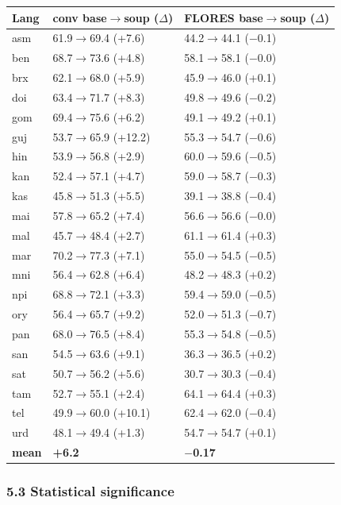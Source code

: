 \documentclass[
  11pt,
]{article}
\begin{document}
\begin{longtable}[]{@{}lll@{}}
\toprule\noalign{}
Lang & conv base$\to$soup ($\Delta$) & FLORES base$\to$soup ($\Delta$) \\
\midrule\noalign{}
\endhead
\bottomrule\noalign{}
\endlastfoot
asm & 61.9$\to$69.4 (+7.6) & 44.2$\to$44.1 ($-$0.1) \\
ben & 68.7$\to$73.6 (+4.8) & 58.1$\to$58.1 ($-$0.0) \\
brx & 62.1$\to$68.0 (+5.9) & 45.9$\to$46.0 (+0.1) \\
doi & 63.4$\to$71.7 (+8.3) & 49.8$\to$49.6 ($-$0.2) \\
gom & 69.4$\to$75.6 (+6.2) & 49.1$\to$49.2 (+0.1) \\
guj & 53.7$\to$65.9 (+12.2) & 55.3$\to$54.7 ($-$0.6) \\
hin & 53.9$\to$56.8 (+2.9) & 60.0$\to$59.6 ($-$0.5) \\
kan & 52.4$\to$57.1 (+4.7) & 59.0$\to$58.7 ($-$0.3) \\
kas & 45.8$\to$51.3 (+5.5) & 39.1$\to$38.8 ($-$0.4) \\
mai & 57.8$\to$65.2 (+7.4) & 56.6$\to$56.6 ($-$0.0) \\
mal & 45.7$\to$48.4 (+2.7) & 61.1$\to$61.4 (+0.3) \\
mar & 70.2$\to$77.3 (+7.1) & 55.0$\to$54.5 ($-$0.5) \\
mni & 56.4$\to$62.8 (+6.4) & 48.2$\to$48.3 (+0.2) \\
npi & 68.8$\to$72.1 (+3.3) & 59.4$\to$59.0 ($-$0.5) \\
ory & 56.4$\to$65.7 (+9.2) & 52.0$\to$51.3 ($-$0.7) \\
pan & 68.0$\to$76.5 (+8.4) & 55.3$\to$54.8 ($-$0.5) \\
san & 54.5$\to$63.6 (+9.1) & 36.3$\to$36.5 (+0.2) \\
sat & 50.7$\to$56.2 (+5.6) & 30.7$\to$30.3 ($-$0.4) \\
tam & 52.7$\to$55.1 (+2.4) & 64.1$\to$64.4 (+0.3) \\
tel & 49.9$\to$60.0 (+10.1) & 62.4$\to$62.0 ($-$0.4) \\
urd & 48.1$\to$49.4 (+1.3) & 54.7$\to$54.7 (+0.1) \\
\textbf{mean} & \textbf{+6.2} & \textbf{$-$0.17} \\
\end{longtable}

\hypertarget{statistical-significance}{%
\subsubsection{5.3 Statistical
significance}\label{statistical-significance}}
\end{document}
